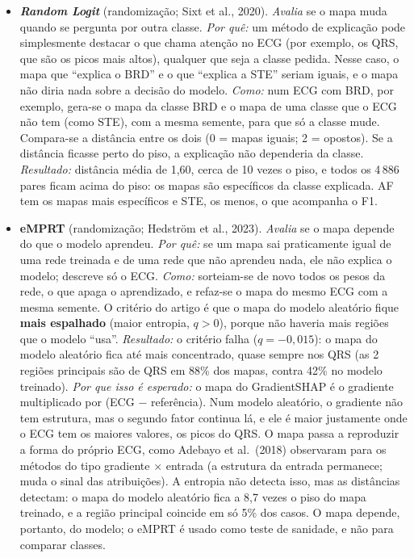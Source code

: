 \documentclass[11pt,a4paper]{article}
\newcommand{\Mx}[1]{\textit{#1}}
\begin{document}
\begin{itemize}
\item \textbf{\Mx{Random Logit}} (randomização; Sixt et al., 2020). \textit{Avalia} se o mapa muda quando se pergunta por outra classe. \textit{Por quê:} um método de explicação pode simplesmente destacar o que chama atenção no ECG (por exemplo, os QRS, que são os picos mais altos), qualquer que seja a classe pedida. Nesse caso, o mapa que ``explica o BRD'' e o que ``explica a STE'' seriam iguais, e o mapa não diria nada sobre a decisão do modelo. \textit{Como:} num ECG com BRD, por exemplo, gera-se o mapa da classe BRD e o mapa de uma classe que o ECG não tem (como STE), com a mesma semente, para que só a classe mude. Compara-se a distância entre os dois (0 = mapas iguais; 2 = opostos). Se a distância ficasse perto do piso, a explicação não dependeria da classe. \textit{Resultado:} distância média de 1,60, cerca de 10 vezes o piso, e todos os 4\,886 pares ficam acima do piso: os mapas são específicos da classe explicada. AF tem os mapas mais específicos e STE, os menos, o que acompanha o F1.

\item \textbf{eMPRT} (randomização; Hedström et al., 2023). \textit{Avalia} se o mapa depende do que o modelo aprendeu. \textit{Por quê:} se um mapa sai praticamente igual de uma rede treinada e de uma rede que não aprendeu nada, ele não explica o modelo; descreve só o ECG. \textit{Como:} sorteiam-se de novo todos os pesos da rede, o que apaga o aprendizado, e refaz-se o mapa do mesmo ECG com a mesma semente. O critério do artigo é que o mapa do modelo aleatório fique \textbf{mais espalhado} (maior entropia, $q > 0$), porque não haveria mais regiões que o modelo ``usa''. \textit{Resultado:} o critério falha ($q = -0{,}015$): o mapa do modelo aleatório fica até mais concentrado, quase sempre nos QRS (as 2 regiões principais são de QRS em 88\% dos mapas, contra 42\% no modelo treinado). \textit{Por que isso é esperado:} o mapa do GradientSHAP é o gradiente multiplicado por (ECG $-$ referência). Num modelo aleatório, o gradiente não tem estrutura, mas o segundo fator continua lá, e ele é maior justamente onde o ECG tem os maiores valores, os picos do QRS. O mapa passa a reproduzir a forma do próprio ECG, como Adebayo et al.\ (2018) observaram para os métodos do tipo gradiente × entrada (a estrutura da entrada permanece; muda o sinal das atribuições). A entropia não detecta isso, mas as distâncias detectam: o mapa do modelo aleatório fica a 8,7 vezes o piso do mapa treinado, e a região principal coincide em só 5\% dos casos. O mapa depende, portanto, do modelo; o eMPRT é usado como teste de sanidade, e não para comparar classes.
\end{itemize}
\end{document}
